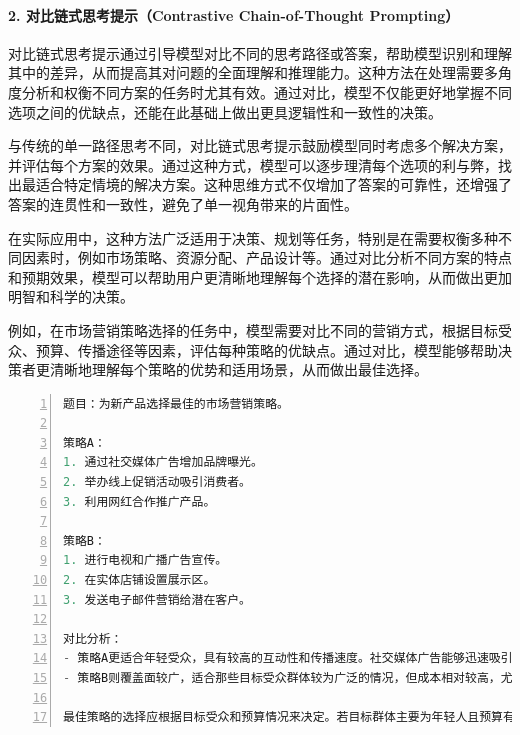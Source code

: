 \paragraph{2. 对比链式思考提示（Contrastive Chain-of-Thought Prompting）} 

对比链式思考提示通过引导模型对比不同的思考路径或答案，帮助模型识别和理解其中的差异，从而提高其对问题的全面理解和推理能力。这种方法在处理需要多角度分析和权衡不同方案的任务时尤其有效。通过对比，模型不仅能更好地掌握不同选项之间的优缺点，还能在此基础上做出更具逻辑性和一致性的决策。

与传统的单一路径思考不同，对比链式思考提示鼓励模型同时考虑多个解决方案，并评估每个方案的效果。通过这种方式，模型可以逐步理清每个选项的利与弊，找出最适合特定情境的解决方案。这种思维方式不仅增加了答案的可靠性，还增强了答案的连贯性和一致性，避免了单一视角带来的片面性。

在实际应用中，这种方法广泛适用于决策、规划等任务，特别是在需要权衡多种不同因素时，例如市场策略、资源分配、产品设计等。通过对比分析不同方案的特点和预期效果，模型可以帮助用户更清晰地理解每个选择的潜在影响，从而做出更加明智和科学的决策。

例如，在市场营销策略选择的任务中，模型需要对比不同的营销方式，根据目标受众、预算、传播途径等因素，评估每种策略的优缺点。通过对比，模型能够帮助决策者更清晰地理解每个策略的优势和适用场景，从而做出最佳选择。



\begin{lstlisting}[language={python},label={},caption={}, basicstyle=\footnotesize\ttfamily, breaklines=true, numbers=left, frame=single]
题目：为新产品选择最佳的市场营销策略。

策略A：
1. 通过社交媒体广告增加品牌曝光。
2. 举办线上促销活动吸引消费者。
3. 利用网红合作推广产品。

策略B：
1. 进行电视和广播广告宣传。
2. 在实体店铺设置展示区。
3. 发送电子邮件营销给潜在客户。

对比分析：
- 策略A更适合年轻受众，具有较高的互动性和传播速度。社交媒体广告能够迅速吸引年轻人群体的关注，线上促销活动则具有较低的成本和较高的灵活性，能够快速反馈效果。而网红合作能够提升品牌的可信度和传播效果，尤其是在短视频平台中表现尤为突出。
- 策略B则覆盖面较广，适合那些目标受众群体较为广泛的情况，但成本相对较高，尤其是电视和广播广告的投入较为昂贵。此外，尽管实体店展示和电子邮件营销能够为线下客户提供更直观的体验，但互动性相对较弱，且传播速度较慢。

最佳策略的选择应根据目标受众和预算情况来决定。若目标群体主要为年轻人且预算有限，策略A将是更为合适的选择；而如果目标是覆盖更广泛的受众，且预算充足，策略B则更具优势。
\end{lstlisting}

